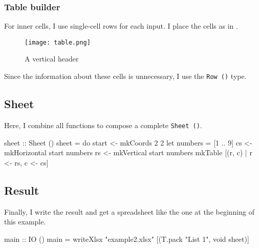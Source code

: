 
\subsubsection{Table builder}

For inner cells, I use single-cell rows for each input. I place the cells as in .

\begin{figure}[h]
  \centering
  \texttt{[image: table.png]}
  \caption{A vertical header}
  \label{fig:table}
\end{figure}

\pagebreak
Since the information about these cells is unnecessary, I use the \texttt{Row ()} type.


\subsection{Sheet}

Here, I combine all functions to compose a complete \texttt{Sheet ()}.

\begin{mycode}
sheet :: Sheet ()
sheet = do
  start <- mkCoords 2 2
  let numbers = [1 .. 9]
  cs <- mkHorizontal start numbers
  rs <- mkVertical start numbers
  mkTable [(r, c) | r <- rs, c <- cs]
\end{mycode}

\subsection{Result}

Finally, I write the result and get a spreadsheet like the one at the beginning of this example.

\begin{mycode}
main :: IO ()
main = writeXlsx "example2.xlsx" [(T.pack "List 1", void sheet)]
\end{mycode}
